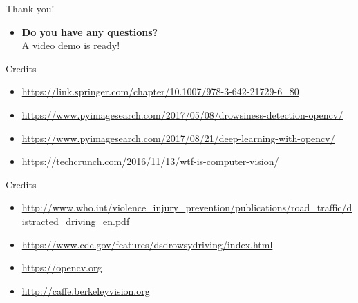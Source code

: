 \documentclass{beamer}
\begin{document}
\begin{frame}{Thank you!}
    \begin{itemize}
        \item \textbf{Do you have any questions?} \\
            \hspace{0.27cm}A video demo is ready!
    \end{itemize}
\end{frame}

\begin{frame}{Credits}
    \begin{itemize}
        \item \url{https://link.springer.com/chapter/10.1007/978-3-642-21729-6_80}
        \item \url{https://www.pyimagesearch.com/2017/05/08/drowsiness-detection-opencv/}
        \item \url{https://www.pyimagesearch.com/2017/08/21/deep-learning-with-opencv/}
        \item \url{https://techcrunch.com/2016/11/13/wtf-is-computer-vision/}
       \end{itemize}
\end{frame}

\begin{frame}{Credits}
    \begin{itemize}
        \item \url{http://www.who.int/violence_injury_prevention/publications/road_traffic/distracted_driving_en.pdf}
        \item \url{https://www.cdc.gov/features/dsdrowsydriving/index.html}
        \item \url{https://opencv.org}
        \item \url{http://caffe.berkeleyvision.org}
    \end{itemize}
\end{frame}
\end{document}
